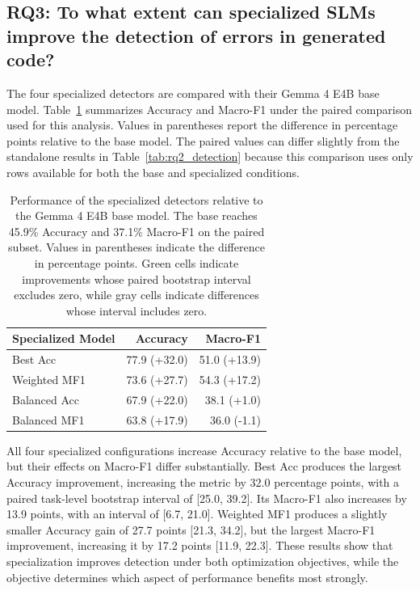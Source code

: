 \subsection{RQ3: To what extent can specialized SLMs improve the detection of errors in generated code?}
\label{sec:rq3}

The four specialized detectors are compared with their Gemma 4 E4B base model. Table~\ref{tab:rq3_specialization} summarizes Accuracy and Macro-F1 under the paired comparison used for this analysis. Values in parentheses report the difference in percentage points relative to the base model. The paired values can differ slightly from the standalone results in Table~\ref{tab:rq2_detection} because this comparison uses only rows available for both the base and specialized conditions.

\newcommand{\improvedcell}[1]{\cellcolor{green!20}#1}
\newcommand{\worsecell}[1]{\cellcolor{red!20}#1}
\newcommand{\uncertaincell}[1]{\cellcolor{gray!15}#1}

\begin{table}[htbp]
\centering
\caption{Performance of the specialized detectors relative to the Gemma 4 E4B base model. The base reaches 45.9\% Accuracy and 37.1\% Macro-F1 on the paired subset. Values in parentheses indicate the difference in percentage points. Green cells indicate improvements whose paired bootstrap interval excludes zero, while gray cells indicate differences whose interval includes zero.}
\label{tab:rq3_specialization}
\begin{tabular}{lrr}
\toprule
\textbf{Specialized Model} &
\textbf{Accuracy} &
\textbf{Macro-F1} \\
\midrule

Best Acc
& \improvedcell{77.9 (+32.0)}
& \improvedcell{51.0 (+13.9)}
\\

Weighted MF1
& \improvedcell{73.6 (+27.7)}
& \improvedcell{54.3 (+17.2)}
\\

Balanced Acc
& \improvedcell{67.9 (+22.0)}
& \uncertaincell{38.1 (+1.0)}
\\

Balanced MF1
& \improvedcell{63.8 (+17.9)}
& \uncertaincell{36.0 (-1.1)}
\\

\bottomrule
\end{tabular}
\end{table}

All four specialized configurations increase Accuracy relative to the base model, but their effects on Macro-F1 differ substantially. Best Acc produces the largest Accuracy improvement, increasing the metric by 32.0 percentage points, with a paired task-level bootstrap interval of [25.0, 39.2]. Its Macro-F1 also increases by 13.9 points, with an interval of [6.7, 21.0]. Weighted MF1 produces a slightly smaller Accuracy gain of 27.7 points [21.3, 34.2], but the largest Macro-F1 improvement, increasing it by 17.2 points [11.9, 22.3]. These results show that specialization improves detection under both optimization objectives, while the objective determines which aspect of performance benefits most strongly.

